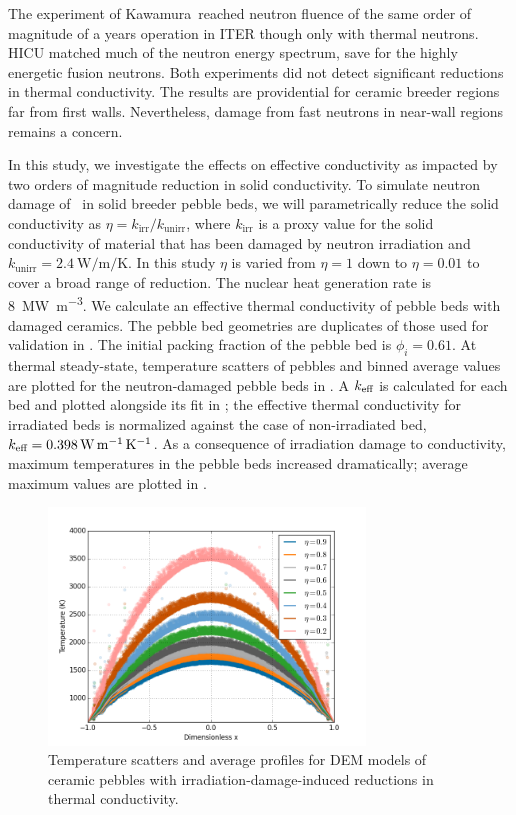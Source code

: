 The experiment of Kawamura\etal~reached neutron fluence of the same order of magnitude of a years operation in ITER though only with thermal neutrons. HICU matched much of the neutron energy spectrum, save for the highly energetic fusion neutrons. Both experiments did not detect significant reductions in thermal conductivity. The results are providential for ceramic breeder regions far from first walls. Nevertheless, damage from fast neutrons in near-wall regions remains a concern.

In this study, we investigate the effects on effective conductivity as impacted by two orders of magnitude reduction in solid conductivity. To simulate neutron damage of \lit~in solid breeder pebble beds, we will parametrically reduce the solid conductivity as $\eta = k_\text{irr} / k_\text{unirr}$, where $k_\text{irr}$ is a proxy value for the solid conductivity of material that has been damaged by neutron irradiation and $k_\text{unirr} = \SI{2.4}{\watt\per\meter\per\kelvin}$. In this study $\eta$ is varied from $\eta = 1$ down to $\eta = 0.01$ to cover a broad range of reduction. The nuclear heat generation rate is \SI{8}{\mega\watt\per\meter\cubed}. We calculate an effective thermal conductivity of pebble beds with damaged ceramics. The pebble bed geometries are duplicates of those used for validation in . The initial packing fraction of the pebble bed is $\phi_i = 0.61$. At thermal steady-state, temperature scatters of pebbles and binned average values are plotted for the neutron-damaged pebble beds in . A $k_\text{eff}$ is calculated for each bed and plotted alongside its fit in ; the effective thermal conductivity for irradiated beds is normalized against the case of non-irradiated bed, $k_\text{eff} = \SI{0.398}{\watt\per\meter\per\kelvin}$. As a consequence of irradiation damage to conductivity, maximum temperatures in the pebble beds increased dramatically; average maximum values are plotted in .

\begin{figure}[ht]
    \centering
    \includegraphics[width = 0.75\textwidth]{figures/irradiated/irradiated-temperatures.png}
    \caption{Temperature scatters and average profiles for DEM models of ceramic pebbles with irradiation-damage-induced reductions in thermal conductivity.}\label{fig:irrad-temps}
\end{figure}

